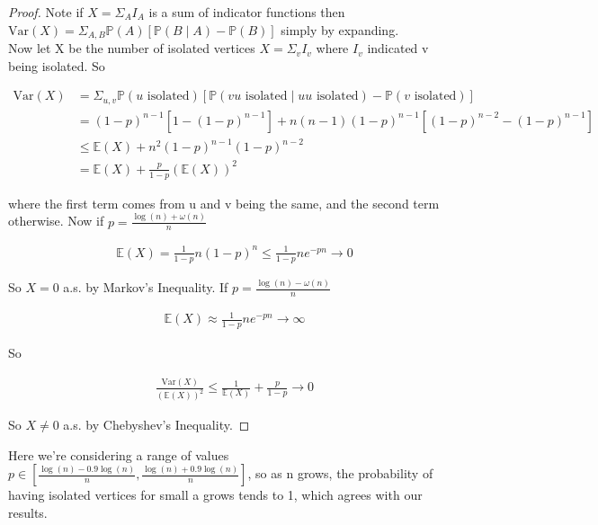 \documentclass[10pt,a4paper]{report}
\begin{document}
\begin{proof}
Note if $X=\Sigma_A I_A$ is a sum of indicator functions then $\text{Var}(X)=\Sigma_{A,B}\mathbb{P}(A)[ \mathbb{P}(B \mid A) -\mathbb{P}(B)]$ simply by expanding.\\

Now let X be the number of isolated vertices $X=\Sigma_v I_v$ where $I_v$ indicated v being isolated. So 

\begin{align*}
\text{Var}(X)&=\Sigma_{u,v} \mathbb{P}(u \text{ isolated})[ \mathbb{P}(v u \text{ isolated} \mid u u \text{ isolated}) -\mathbb{P}(v \text{ isolated})]\\
&=(1-p)^{n-1}[1-(1-p)^{n-1}] + n(n-1)(1-p)^{n-1}[(1-p)^{n-2}-(1-p)^{n-1}]\\
&\leq \mathbb{E}(X)+n^2(1-p)^{n-1}(1-p)^{n-2}\\
&= \mathbb{E}(X) + \frac{p}{1-p}(\mathbb{E}(X))^2
\end{align*}

where the first term comes from u and v being the same, and the second term otherwise. Now if $p =\frac{\log(n)+\omega(n)}{n}$ 

\begin{align*}
\mathbb{E}(X) = \frac{1}{1-p}n(1-p)^n \leq \frac{1}{1-p}ne^{-pn} \rightarrow 0
\end{align*}

So $X=0$ a.s. by Markov's Inequality. If $p =\frac{\log(n)-\omega(n)}{n}$ 

\begin{align*}
\mathbb{E}(X) \approx \frac{1}{1-p}ne^{-pn} \rightarrow \infty
\end{align*}

So 

\begin{align*}
\frac{\text{Var}(X)}{(\mathbb{E}(X))^2} \leq \frac{1}{\mathbb{E}(X)} + \frac{p}{1-p} \rightarrow 0
\end{align*}

So $X\neq0$ a.s. by Chebyshev's Inequality.

\end{proof}

Here we're considering a range of values $p\in[\frac{\log(n)-0.9\log(n)}{n},\frac{\log(n)+0.9\log(n)}{n} ]$, so as n grows, the probability of having isolated vertices for small a grows tends to 1, which agrees with our results.
\end{document}
